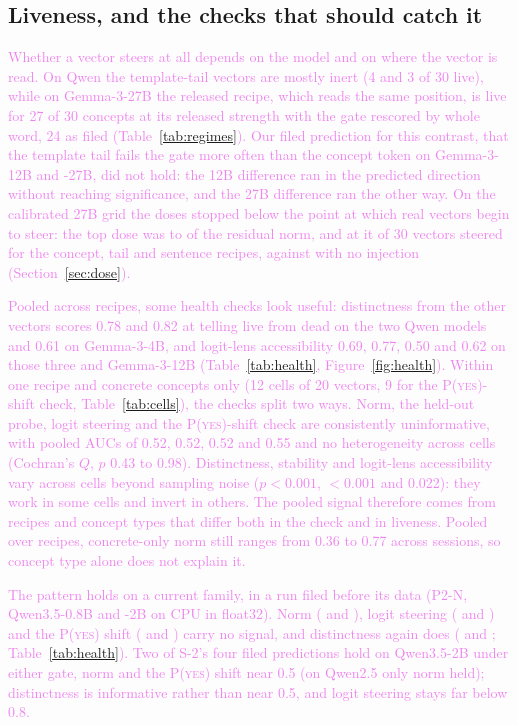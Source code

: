 \documentclass[11pt,a4paper]{article}
\newcommand{\pyes}{P(\textup{\textsc{yes}})}
\newcommand{\draft}[1]{\textcolor{violet}{#1}}
\begin{document}
\subsection{Liveness, and the checks that should catch it}
\label{sec:liveness}
\draft{Whether a vector steers at all depends on the model and on where the vector is read. On Qwen
the template-tail vectors are mostly inert (4 and 3 of 30 live), while on Gemma-3-27B the released
recipe, which reads the same position, is live for 27 of 30 concepts at its released strength
with the gate rescored by whole word, 24 as filed (Table~\ref{tab:regimes}). Our filed prediction for this contrast, that the template tail fails the
gate more often than the concept token on Gemma-3-12B and -27B, did not hold: the 12B difference ran
in the predicted direction without reaching significance, and the 27B difference ran the other
way. On the calibrated 27B grid the doses stopped below the point at which real vectors begin to
steer: the top dose was \cfourTopLo{} to \cfourTopHi{} of the residual norm, and at it \cfourTopSteered{}
of 30 vectors steered for the concept, tail and sentence recipes, against \cfourZeroSteered{} with no
injection (Section~\ref{sec:dose}).}

\draft{Pooled across recipes, some health checks look useful: distinctness from the other vectors
scores 0.78 and 0.82 at telling live from dead on the two Qwen models and 0.61 on Gemma-3-4B, and
logit-lens accessibility 0.69, 0.77, 0.50 and 0.62 on those three and Gemma-3-12B
(Table~\ref{tab:health}, Figure~\ref{fig:health}). Within one recipe and concrete concepts only (12
cells of 20 vectors, 9 for the \pyes{}-shift check, Table~\ref{tab:cells}), the checks split two ways. Norm, the
held-out probe, logit steering and the \pyes{}-shift check are consistently uninformative, with
pooled AUCs of 0.52, 0.52, 0.52 and 0.55 and no heterogeneity across cells (Cochran's $Q$, $p$
0.43 to 0.98). Distinctness, stability and logit-lens accessibility vary across cells beyond
sampling noise ($p < 0.001$, $< 0.001$ and 0.022): they work in some cells and invert in others.
The pooled signal therefore comes from recipes and concept types that differ both in the check and
in liveness. Pooled over recipes, concrete-only norm still ranges from 0.36 to 0.77 across
sessions, so concept type alone does not explain it.}

\draft{The pattern holds on a current family, in a run filed before its data (P2-N, Qwen3.5-0.8B and
-2B on CPU in float32). Norm (\pnSmallNorm{} and \pnTwoNorm{}), logit steering (\pnSmallLogit{} and
\pnTwoLogit{}) and the \pyes{} shift (\pnSmallPyes{} and \pnTwoPyes{}) carry no signal, and
distinctness again does (\pnSmallDist{} and \pnTwoDist{}; Table~\ref{tab:health}). Two of S-2's four
filed predictions hold on Qwen3.5-2B under either gate, norm and the \pyes{} shift near 0.5 (on
Qwen2.5 only norm held); distinctness is informative rather than near 0.5, and logit steering stays
far below 0.8.}
\end{document}
